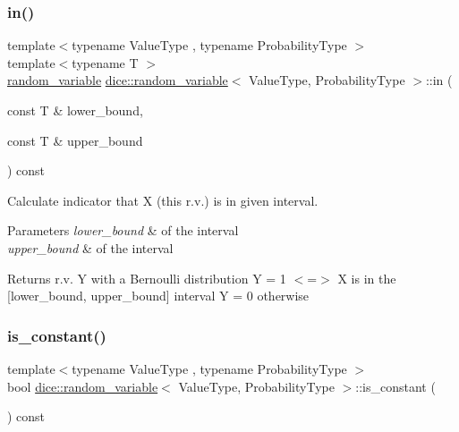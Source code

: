 \subsubsection{\texorpdfstring{in()}{in()}}
{\footnotesize\ttfamily template$<$typename Value\+Type , typename Probability\+Type $>$ \\
template$<$typename T $>$ \\
\mbox{\hyperlink{classdice_1_1random__variable}{random\+\_\+variable}} \mbox{\hyperlink{classdice_1_1random__variable}{dice\+::random\+\_\+variable}}$<$ Value\+Type, Probability\+Type $>$\+::in (\begin{DoxyParamCaption}\item[{const T \&}]{lower\+\_\+bound,  }\item[{const T \&}]{upper\+\_\+bound }\end{DoxyParamCaption}) const\hspace{0.3cm}{\ttfamily [inline]}}



Calculate indicator that X (this r.\+v.) is in given interval. 


\begin{DoxyParams}{Parameters}
{\em lower\+\_\+bound} & of the interval \\
\hline
{\em upper\+\_\+bound} & of the interval\\
\hline
\end{DoxyParams}
\begin{DoxyReturn}{Returns}
r.\+v. Y with a Bernoulli distribution Y = 1 $<$=$>$ X is in the \mbox{[}lower\+\_\+bound, upper\+\_\+bound\mbox{]} interval Y = 0 otherwise 
\end{DoxyReturn}
\mbox{\label{classdice_1_1random__variable_a42d682610d251d5305dd349a71a023eb}} 
\subsubsection{\texorpdfstring{is\+\_\+constant()}{is\_constant()}}
{\footnotesize\ttfamily template$<$typename Value\+Type , typename Probability\+Type $>$ \\
bool \mbox{\hyperlink{classdice_1_1random__variable}{dice\+::random\+\_\+variable}}$<$ Value\+Type, Probability\+Type $>$\+::is\+\_\+constant (\begin{DoxyParamCaption}{ }\end{DoxyParamCaption}) const\hspace{0.3cm}{\ttfamily [inline]}}



